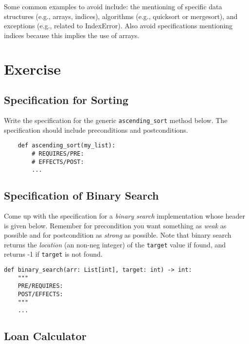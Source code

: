 \documentclass[oneside,11pt,dvipsnames]{book}
\newcommand{\code}[1]{\texttt{#1}}
\begin{document}
Some common examples to avoid include: the mentioning of specific data structures (e.g., arrays, indices), algorithms (e.g., quicksort or mergesort), and exceptions (e.g., related to IndexError). Also avoid specifications mentioning indices because this implies the use of arrays.




\section{Exercise}

\subsection{Specification for Sorting}
Write the specification for the generic \code{ascending\_sort} method below. The specification should include preconditions and postconditions.
\begin{lstlisting}
    def ascending_sort(my_list):
        # REQUIRES/PRE: 
        # EFFECTS/POST: 
        ...
\end{lstlisting}
    


\subsection{Specification of Binary Search}

Come up with the specification for a \emph{binary search} implementation whose header is given below. Remember for precondition you want something as \emph{weak} as possible and for postcondition as \emph{strong} as possible. Note that binary search returns the \emph{location} (an non-neg integer) of the \code{target} value if found, and returns -1 if \code{target} is not found. 

\begin{lstlisting}
def binary_search(arr: List[int], target: int) -> int:
    """
    PRE/REQUIRES: 
    POST/EFFECTS: 
    """
    ... 
\end{lstlisting}


\subsection{Loan Calculator}\label{ex:loan}    
\end{document}
